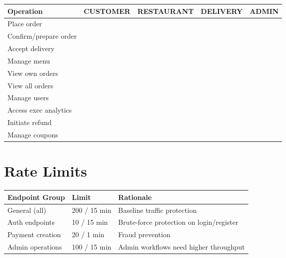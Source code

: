 \documentclass[11pt,a4paper,twoside]{book}
\newcommand{\th}[1]{\textbf{\color{white}#1}}
\newcommand{\yes}{\textcolor{ok}{\faCheckCircle}}
\newcommand{\no}{\textcolor{crit}{\faTimesCircle}}
\begin{document}
\begin{center}\small
\begin{tabular}{p{4cm}cccc}
\toprule
\rowcolor{headbg}\th{Operation} & \th{CUSTOMER} & \th{RESTAURANT} & \th{DELIVERY} & \th{ADMIN} \\
\midrule
Place order          & \yes{} & \no{}  & \no{}  & \yes{} \\
\rowcolor{rowalt}Confirm/prepare order & \no{}  & \yes{} & \no{}  & \yes{} \\
Accept delivery      & \no{}  & \no{}  & \yes{} & \yes{} \\
\rowcolor{rowalt}Manage menu          & \no{}  & \yes{} & \no{}  & \yes{} \\
View own orders      & \yes{} & \yes{} & \yes{} & \yes{} \\
\rowcolor{rowalt}View all orders      & \no{}  & \no{}  & \no{}  & \yes{} \\
Manage users         & \no{}  & \no{}  & \no{}  & \yes{} \\
\rowcolor{rowalt}Access exec analytics & \no{}  & \no{}  & \no{}  & \yes{} \\
Initiate refund      & \yes{} & \no{}  & \no{}  & \yes{} \\
\rowcolor{rowalt}Manage coupons       & \no{}  & \yes{} & \no{}  & \yes{} \\
\bottomrule
\end{tabular}
\end{center}

\section{Rate Limits}

\begin{center}\small
\begin{tabular}{p{4cm}p{2.5cm}p{6cm}}
\toprule
\rowcolor{headbg}\th{Endpoint Group} & \th{Limit} & \th{Rationale} \\
\midrule
General (all)    & 200 / 15 min & Baseline traffic protection \\
\rowcolor{rowalt}Auth endpoints   & 10 / 15 min  & Brute-force protection on login/register \\
Payment creation & 20 / 1 min   & Fraud prevention \\
\rowcolor{rowalt}Admin operations & 100 / 15 min & Admin workflows need higher throughput \\
\bottomrule
\end{tabular}
\end{center}
\end{document}
